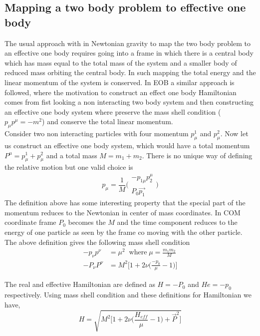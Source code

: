 \documentclass[prd,preprintnumbers,onecolumn,eqsecnum,floatfix,letter]{revtex4}
\begin{document}
\subsection{Mapping a two body problem to effective one body}
The usual approach with in Newtonian gravity to map the two body problem to an effective one body requires going into a frame in which there is a central body which has mass equal to the total mass of the system and a smaller body of reduced mass orbiting the central body. In such mapping the total energy and the linear momentum of the system is conserved. In EOB a similar approach is followed, where the motivation to construct an effect one body Hamiltonian comes from fist looking a non interacting two body system and then constructing an effective one body system where preserve the mass shell condition ($p_\mu p^\mu = -m^2$) and conserve the total linear momentum. \\
Consider two non interacting particles with four momentum $p_\mu^1$ and $p_\mu^2$. Now let us construct an effective one body system, which would have a total momentum $P^\mu = p_\mu^1 + p_\mu^2$ and a total mass $M = m_1+m_2$. There is no unique way of defining the relative motion but one valid choice is
\begin{equation}
	p_\mu = \frac{1}{M}\Bigg(\begin{array}{cc}
	-p_{1\mu}p_{2}^\mu \\
	P_0 \overrightarrow{p_1}
	\end{array}\Bigg)
\end{equation}
The definition above has some interesting property that the special part of the momentum reduces to the Newtonian in center of mass coordinates. In COM coordinate frame $P_0$ becomes the $M$ and the time component reduces to the energy of one particle as seen by the frame co moving with the other particle. The above definition gives the following mass shell condition
\begin{align}
	-p_\nu p^\nu &= \mu^2 \;\; \text{where} \; \mu = \frac{m_1 m_2}{M}\\
	-P_\nu P^\nu &= M^2\Bigg[1 + 2\nu \Bigg(\frac{-p_0}{\mu} - 1\Bigg)\Bigg]
\end{align}

The real and effective Hamiltonian are defined as $H = - P_0\nonumber$ and $He = -p_0$ respectively. Using mass shell condition and these definitions for Hamiltonian we have,
\begin{equation}
	H = \sqrt{M^2\Bigg[1 + 2 \nu\Bigg(\frac{H_{eff}}{\mu}-1\Bigg) + \overrightarrow{P}^2\Bigg]}
	\label{Real Hamiltonian}
\end{equation}
   
\end{document}
